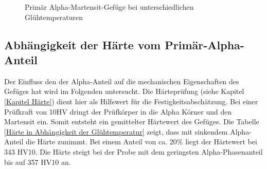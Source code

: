\documentclass[a4paper, 11pt]{tubsreprt}
\begin{document}
\begin{figure}
\caption{Primär Alpha-Martensit-Gefüge bei unterschiedlichen Glühtemperaturen}
\label{Alle Glühen}
\end{figure}

\newpage
\subsection{Abhängigkeit der Härte vom Primär-Alpha-Anteil} \label{Kapitel Abhängigkeit der Härte vom Primäralphaanteil}
Der Einfluss den der Alpha-Anteil auf die mechanischen Eigenschaften des Gefüges hat wird im Folgenden untersucht. Die Härteprüfung (siehe Kapitel \ref{Kapitel Härte}) dient hier als Hilfswert für die Festigkeitsabschätzung. Bei einer Prüfkraft von 10HV dringt der Prüfkörper in die Alpha Körner und den Martensit ein. Somit entsteht ein gemittelter Härtewert des Gefüges. Die Tabelle \ref{Härte in Abhängigkeit der Glühtemperatur} zeigt, dass mit sinkendem Alpha-Anteil die Härte zunimmt. Bei einem Anteil von ca. 20\% liegt der Härtewert bei 343 HV10. Die Härte steigt bei der Probe mit dem geringsten Alpha-Phasenanteil bis auf 357 HV10 an.
\end{document}
